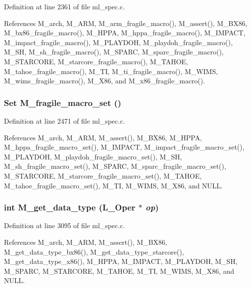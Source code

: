 Definition at line 2361 of file ml\_\-spec.c.

References M\_\-arch, M\_\-ARM, M\_\-arm\_\-fragile\_\-macro(), M\_\-assert(), M\_\-BX86, M\_\-bx86\_\-fragile\_\-macro(), M\_\-HPPA, M\_\-hppa\_\-fragile\_\-macro(), M\_\-IMPACT, M\_\-impact\_\-fragile\_\-macro(), M\_\-PLAYDOH, M\_\-playdoh\_\-fragile\_\-macro(), M\_\-SH, M\_\-sh\_\-fragile\_\-macro(), M\_\-SPARC, M\_\-sparc\_\-fragile\_\-macro(), M\_\-STARCORE, M\_\-starcore\_\-fragile\_\-macro(), M\_\-TAHOE, M\_\-tahoe\_\-fragile\_\-macro(), M\_\-TI, M\_\-ti\_\-fragile\_\-macro(), M\_\-WIMS, M\_\-wims\_\-fragile\_\-macro(), M\_\-X86, and M\_\-x86\_\-fragile\_\-macro().
\subsubsection{\setlength{\rightskip}{0pt plus 5cm}\bf{Set} M\_\-fragile\_\-macro\_\-set ()}\label{ml__spec_8c_a4e0e1630d6bb3e9e647315e96c04d9e}




Definition at line 2471 of file ml\_\-spec.c.

References M\_\-arch, M\_\-ARM, M\_\-assert(), M\_\-BX86, M\_\-HPPA, M\_\-hppa\_\-fragile\_\-macro\_\-set(), M\_\-IMPACT, M\_\-impact\_\-fragile\_\-macro\_\-set(), M\_\-PLAYDOH, M\_\-playdoh\_\-fragile\_\-macro\_\-set(), M\_\-SH, M\_\-sh\_\-fragile\_\-macro\_\-set(), M\_\-SPARC, M\_\-sparc\_\-fragile\_\-macro\_\-set(), M\_\-STARCORE, M\_\-starcore\_\-fragile\_\-macro\_\-set(), M\_\-TAHOE, M\_\-tahoe\_\-fragile\_\-macro\_\-set(), M\_\-TI, M\_\-WIMS, M\_\-X86, and NULL.
\subsubsection{\setlength{\rightskip}{0pt plus 5cm}int M\_\-get\_\-data\_\-type (L\_\-Oper $\ast$ {\em op})}\label{ml__spec_8c_bb083fbe2d3784a7d301a9429203cd0e}




Definition at line 3095 of file ml\_\-spec.c.

References M\_\-arch, M\_\-ARM, M\_\-assert(), M\_\-BX86, M\_\-get\_\-data\_\-type\_\-bx86(), M\_\-get\_\-data\_\-type\_\-starcore(), M\_\-get\_\-data\_\-type\_\-x86(), M\_\-HPPA, M\_\-IMPACT, M\_\-PLAYDOH, M\_\-SH, M\_\-SPARC, M\_\-STARCORE, M\_\-TAHOE, M\_\-TI, M\_\-WIMS, M\_\-X86, and NULL.
